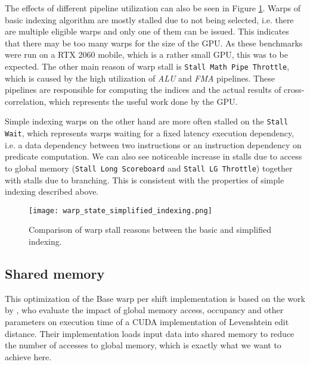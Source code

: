 The effects of different pipeline utilization can also be seen in Figure \ref{fig:warp_state_simplified_indexing}. Warps of basic indexing algorithm are mostly stalled due to not being selected, i.e. there are multiple eligible warps and only one of them can be issued. This indicates that there may be too many warps for the size of the GPU. As these benchmarks were run on a RTX 2060 mobile, which is a rather small GPU, this was to be expected. The other main reason of warp stall is \texttt{Stall Math Pipe Throttle}, which is caused by the high utilization of \textit{ALU} and \textit{FMA} pipelines. These pipelines are responsible for computing the indices and the actual results of cross-correlation, which represents the useful work done by the GPU.

Simple indexing warps on the other hand are more often stalled on the \texttt{Stall Wait}, which represents warps waiting for a fixed latency execution dependency, i.e. a data dependency between two instructions or an instruction dependency on predicate computation. We can also see noticeable increase in stalls due to access to global memory (\texttt{Stall Long Scoreboard} and \texttt{Stall LG Throttle}) together with stalls due to branching. This is consistent with the properties of simple indexing described above.

\begin{figure}[ht]
	\centering
	\texttt{[image: warp\_state\_simplified\_indexing.png]}
	\caption{Comparison of warp stall reasons between the basic and simplified indexing.}
	\label{fig:warp_state_simplified_indexing}
\end{figure}

\subsection{Shared memory}
\label{sec:warp_per_shift_shared_mem}

This optimization of the Base warp per shift implementation is based on the work by \citet{paper:parameter_optimization}, who evaluate the impact of global memory access, occupancy and other parameters on execution time of a CUDA implementation of Levenshtein edit distance. Their implementation loads input data into shared memory to reduce the number of accesses to global memory, which is exactly what we want to achieve here.


